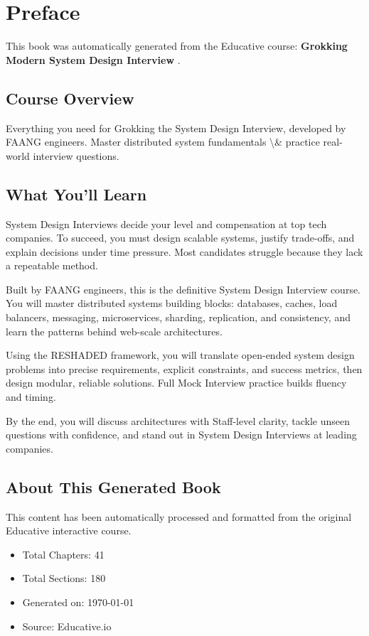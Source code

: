 \documentclass[../Main.tex]{subfiles}
\begin{document}
\chapter*{Preface}

This book was automatically generated from the Educative course: \textbf{ Grokking Modern System Design Interview }.

\section*{Course Overview}
Everything you need for Grokking the System Design Interview, developed by FAANG engineers. Master distributed system fundamentals \textbackslash{}& practice real-world interview questions.

\section*{What You'll Learn}
System Design Interviews decide your level and compensation at top tech companies. To succeed, you must design scalable systems, justify trade-offs, and explain decisions under time pressure. Most candidates struggle because they lack a repeatable method.

Built by FAANG engineers, this is the definitive System Design Interview course. You will master distributed systems building blocks: databases, caches, load balancers, messaging, microservices, sharding, replication, and consistency, and learn the patterns behind web-scale architectures.

Using the RESHADED framework, you will translate open-ended system design problems into precise requirements, explicit constraints, and success metrics, then design modular, reliable solutions. Full Mock Interview practice builds fluency and timing.

By the end, you will discuss architectures with Staff-level clarity, tackle unseen questions with confidence, and stand out in System Design Interviews at leading companies.

\section*{About This Generated Book}
This content has been automatically processed and formatted from the original Educative interactive course. 

\begin{itemize}
    \item Total Chapters: 41
    \item Total Sections: 180
    \item Generated on: \today
    \item Source: Educative.io
\end{itemize}
\end{document}
